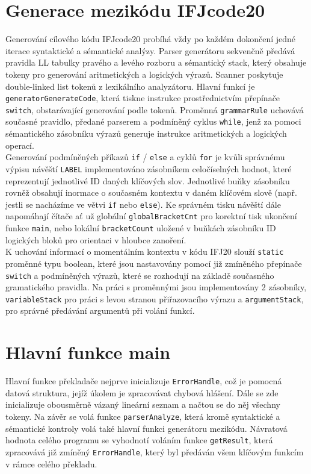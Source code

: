 \documentclass[a4paper, 12pt]{article}
\begin{document}
\section{Generace mezikódu IFJcode20}
Generování cílového kódu IFJcode20 probíhá vždy po každém dokončení jedné iterace syntaktické a sémantické analýzy. Parser generátoru sekvenčně předává pravidla LL tabulky pravého a levého rozboru a sémantický stack, který obsahuje tokeny pro generování aritmetických a logických výrazů. Scanner poskytuje double-linked list tokenů z lexikálního analyzátoru.
\newline
\newline
Hlavní funkcí je \verb|generatorGenerateCode|, která tiskne instrukce prostřednictvím přepínače \verb|switch|, obstarávající generování podle tokenů. Proměnná \verb|grammarRule| uchovává současné pravidlo, předané parserem a podmíněný cyklus \verb|while|, jenž za pomoci sémantického zásobníku výrazů generuje instrukce aritmetických a logických operací.\\
\newline
Generování podmíněných příkazů \verb|if| / \verb|else| a cyklů \verb|for| je kvůli správnému výpisu návěští \verb|LABEL| implementováno  zásobníkem celočíselných hodnot, které reprezentují jednotlivé ID daných klíčových slov. Jednotlivé buňky zásobníku rovněž obsahují inormace o současném kontextu v daném klíčovém slově (např. jestli se nacházíme ve větvi \verb|if| nebo \verb|else|). Ke správném tisku návěští dále napomáhají čítače ať už globální \verb|globalBracketCnt| pro korektní tisk ukončení funkce \verb|main|, nebo lokální \verb|bracketCount| uložené v buňkách zásobníku ID logických bloků pro orientaci v hloubce zanoření.\\
\newline
K uchování informací o momentálním kontextu v kódu IFJ20 slouží \verb|static| proměnné typu boolean, které jsou nastavovány pomocí již zmíněného přepínače \verb|switch| a podmíněných výrazů, které se rozhodují na základě současného gramatického pravidla. Na práci s proměnnými jsou implementovány 2 zásobníky, \verb|variableStack| pro práci s levou stranou přiřazovacího výrazu a \verb|argumentStack|, pro správné předávání argumentů při volání funkcí.

\section{Hlavní funkce main}
Hlavní funkce překladače nejprve inicializuje \verb|ErrorHandle|, což je pomocná datová struktura, jejíž úkolem je zpracovávat chybová hlášení.
Dále se zde inicializuje obousměrně vázaný lineární seznam a načtou se do něj všechny tokeny. Na závěr se volá funkce \verb|parserAnalyze|,
která kromě syntaktické a sémantické kontroly volá také hlavní funkci generátoru mezikódu. Návratová hodnota celého programu se vyhodnotí
voláním funkce \verb|getResult|, která zpracovává již zmíněný \verb|ErrorHandle|, který byl předáván všem klíčovým funkcím v rámce celého překladu. 
\end{document}
